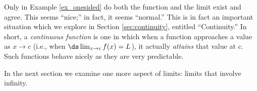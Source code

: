 Only in Example \ref{ex_onesided} do both the function and the limit exist and agree. This seems ``nice;'' in fact, it seems ``normal.'' This is in fact an important situation which we explore in Section \ref{sec:continuity}, entitled ``Continuity.'' In short, a \textit{continuous function} is one in which when a function approaches a value as $x\rightarrow c$ (i.e., when $\ds \lim_{x\to c} f(x) = L$), it actually \textit{attains} that value at $c$. Such functions behave nicely as they are very predictable.

In the next section we examine one more aspect of limits: limits that involve infinity.

